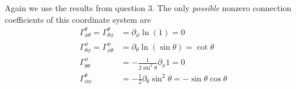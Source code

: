 \documentclass[12pt]{article}
\begin{document}
    \subsubsection{} Again we use the results from question 3. The only \textit{possible} nonzero connection coefficients of this coordinate system are
    \begin{align*}
        \Gamma^\theta_{\phi \theta } =
        \Gamma^\theta_{\theta \phi}                             & =  \partial_\phi \ln(1) = 0                                              \\
        \Gamma^\phi_{\theta \phi } = \Gamma^\phi_{\phi \theta } & = \partial_\theta \ln(\sin \theta ) = \cot\theta                         \\
        \Gamma^\phi_{\theta \theta }                            & =  - \frac{1}{2\sin^2\theta }\partial_\phi 1 = 0                         \\
        \Gamma^\theta_{\phi \phi  }                             & =  - \frac{1}{2}\partial_\theta \sin^2\theta  = - \sin\theta \cos \theta
    \end{align*}
\end{document}
